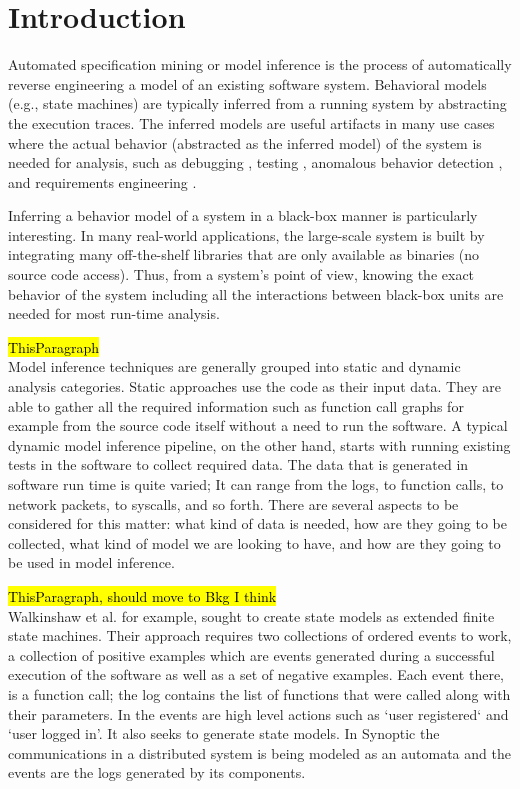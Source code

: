 \chapter{Introduction}
\label{sec:intro}
Automated specification mining or model inference \cite{lo2011mining} is the process of automatically reverse engineering a model of an existing software system. Behavioral models (e.g., state machines) are typically inferred from a running system by abstracting the execution traces. The inferred models are useful artifacts in many use cases where the actual behavior (abstracted as the inferred model) of the system is needed for analysis, such as debugging \cite{hybriddebugging, shang2013assisting, jafar2019interactive}, testing \cite{Walkinshaw2018TestingBlackBox, ModelBasedTesting, Papadopoulos2015, dallmeier2011automatically}, anomalous behavior detection \cite{valdes2000adaptive}, and requirements engineering \cite{damas2005generating}. 

Inferring a behavior model of a system in a black-box manner is particularly interesting. In many real-world applications, the large-scale system is built by integrating many off-the-shelf libraries that are only available as binaries (no source code access). Thus, from a system's point of view, knowing the exact behavior of the system including all the interactions between black-box units are needed for most run-time analysis. 

\hl{ThisParagraph}\\
Model inference techniques are generally grouped into static and dynamic analysis categories. 
Static approaches use the code as their input data. They are able to gather all the required information such as function call graphs for example from the source code itself without a need to run the software.
A typical dynamic model inference pipeline, on the other hand, starts with running existing tests in the software to collect required data. \cite{Papadopoulos2015} 
The data that is generated in software run time is quite varied; It can range from the logs, to function calls, to network packets, to syscalls, and so forth. There are several aspects to be considered for this matter: what kind of data is needed, how are they going to be collected, what kind of model we are looking to have, and how are they going to be used in model inference. 

\hl{ThisParagraph, should move to Bkg I think}\\
Walkinshaw et al. for example, \cite{walkinshaw2016inferring} sought to create state models as extended finite state machines. Their approach requires two collections of ordered events to work, a collection of positive examples which are events generated during a successful execution of the software as well as a set of negative examples. Each event there, is a function call; the log contains the list of functions that were called along with their parameters. 
In \cite{howar2012inferring} the events are high level actions such as `user registered` and `user logged in'. It also seeks to generate state models.
In Synoptic \cite{schneider2010synoptic} the communications in a distributed system is being modeled as an automata and the events are the logs generated by its components.


